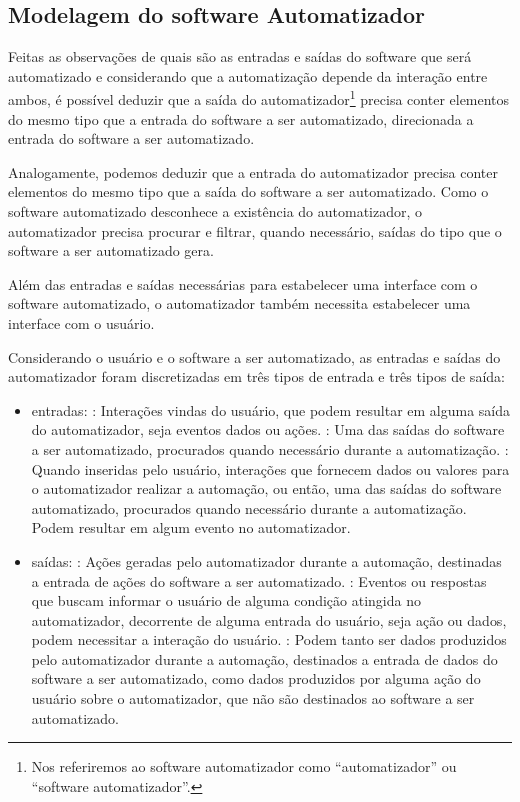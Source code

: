 \documentclass[tg]{mdtufsm}
\begin{document}
            \subsection{Modelagem do software Automatizador}

                Feitas as observações de quais são as entradas e saídas do software que será automatizado e considerando que a automatização depende da interação entre ambos, é possível deduzir que a saída do automatizador\footnote{ Nos referiremos ao software automatizador como “automatizador” ou “software automatizador”.} precisa conter elementos do mesmo tipo que a entrada do software a ser automatizado, direcionada a entrada do software a ser automatizado.

                Analogamente, podemos deduzir que a entrada do automatizador precisa conter elementos do mesmo tipo que a saída do software a ser automatizado. Como o software automatizado desconhece a existência do automatizador, o automatizador precisa procurar e filtrar, quando necessário, saídas do tipo que o software a ser automatizado gera.

                Além das entradas e saídas necessárias para estabelecer uma interface com o software automatizado, o automatizador também necessita estabelecer uma interface com o usuário.

                Considerando o usuário e o software a ser automatizado, as entradas e saídas do automatizador foram discretizadas em três tipos de entrada e três tipos de saída:

                \begin{itemize}
                    \item entradas:
                        : Interações vindas do usuário, que podem resultar em alguma saída do automatizador, seja eventos dados ou ações.
                        : Uma das saídas do software a ser automatizado, procurados quando necessário durante a automatização.
                        : Quando inseridas pelo usuário, interações que fornecem dados ou valores para o automatizador realizar a automação, ou então, uma das saídas do software automatizado, procurados quando necessário durante a automatização. Podem resultar em algum evento no automatizador.
                    \item saídas:
                        : Ações geradas pelo automatizador durante a automação, destinadas a entrada de ações do software a ser automatizado.
                        : Eventos ou respostas que buscam informar o usuário de alguma condição atingida no automatizador, decorrente de alguma entrada do usuário, seja ação ou dados, podem necessitar a interação do usuário.
                        : Podem tanto ser dados produzidos pelo automatizador durante a automação, destinados a entrada de dados do software a ser automatizado, como dados produzidos por alguma ação do usuário sobre o automatizador, que não são destinados ao software a ser automatizado.
                \end{itemize}
\end{document}
